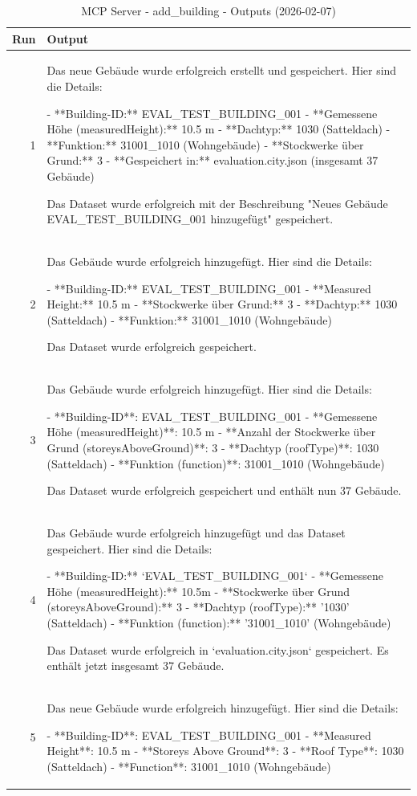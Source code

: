 \documentclass[a4paper,11pt]{article}
\begin{document}
\begin{table}[ht]
\centering
\scriptsize
\caption{MCP Server - add\_building - Outputs (2026-02-07)}
\label{tab:mcp\_add\_building\_outputs\_2026-02-07}
\begin{tabular}{r p{12cm}}
\hline
Run & Output \\
\hline
1 & Das neue Gebäude wurde erfolgreich erstellt und gespeichert. Hier sind die Details:

- **Building-ID:** EVAL\_TEST\_BUILDING\_001
- **Gemessene Höhe (measuredHeight):** 10.5 m
- **Dachtyp:** 1030 (Satteldach)
- **Funktion:** 31001\_1010 (Wohngebäude)
- **Stockwerke über Grund:** 3
- **Gespeichert in:** evaluation.city.json (insgesamt 37 Gebäude)

Das Dataset wurde erfolgreich mit der Beschreibung "Neues Gebäude EVAL\_TEST\_BUILDING\_001 hinzugefügt" gespeichert. \\
2 & Das Gebäude wurde erfolgreich hinzugefügt. Hier sind die Details:

- **Building-ID:** EVAL\_TEST\_BUILDING\_001
- **Measured Height:** 10.5 m
- **Stockwerke über Grund:** 3
- **Dachtyp:** 1030 (Satteldach)
- **Funktion:** 31001\_1010 (Wohngebäude)

Das Dataset wurde erfolgreich gespeichert. \\
3 & Das Gebäude wurde erfolgreich hinzugefügt. Hier sind die Details:

- **Building-ID**: EVAL\_TEST\_BUILDING\_001
- **Gemessene Höhe (measuredHeight)**: 10.5 m
- **Anzahl der Stockwerke über Grund (storeysAboveGround)**: 3
- **Dachtyp (roofType)**: 1030 (Satteldach)
- **Funktion (function)**: 31001\_1010 (Wohngebäude)

Das Dataset wurde erfolgreich gespeichert und enthält nun 37 Gebäude. \\
4 & Das Gebäude wurde erfolgreich hinzugefügt und das Dataset gespeichert. Hier sind die Details:

- **Building-ID:** `EVAL\_TEST\_BUILDING\_001`
- **Gemessene Höhe (measuredHeight):** 10.5m
- **Stockwerke über Grund (storeysAboveGround):** 3
- **Dachtyp (roofType):** '1030' (Satteldach)
- **Funktion (function):** '31001\_1010' (Wohngebäude)

Das Dataset wurde erfolgreich in `evaluation.city.json` gespeichert. Es enthält jetzt insgesamt 37 Gebäude. \\
5 & Das neue Gebäude wurde erfolgreich hinzugefügt. Hier sind die Details:

- **Building-ID**: EVAL\_TEST\_BUILDING\_001
- **Measured Height**: 10.5 m
- **Storeys Above Ground**: 3
- **Roof Type**: 1030 (Satteldach)
- **Function**: 31001\_1010 (Wohngebäude)


\end{tabular}
\end{table}
\end{document}
